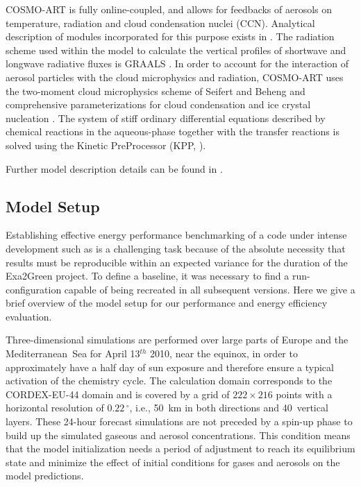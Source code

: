 COSMO-ART  is  fully  online-coupled,  and  allows  for  feedbacks  of
aerosols  on  temperature,  radiation  and cloud  condensation  nuclei
(CCN).   Analytical  description  of  modules  incorporated  for  this
purpose  exists  in  \cite{Vogel-2009, Bangert-2011}.   The  radiation
scheme used  within the  model to calculate  the vertical  profiles of
shortwave and longwave  radiative fluxes is GRAALS \cite{Ritter-1992}.
In order to account for  the interaction of aerosol particles with the
cloud microphysics and radiation,  COSMO-ART uses the two-moment cloud
microphysics  scheme  of Seifert  and  Beheng \cite{Seifert-2006}  and
comprehensive parameterizations for cloud condensation and ice crystal
nucleation  \cite{Bangert-2011, Bangert-2012}.   The  system of  stiff
ordinary differential equations described by chemical reactions in the
aqueous-phase together with the transfer reactions is solved using the
Kinetic PreProcessor (KPP, \cite{Damian-2002}).

Further model description details  can be found in \cite{Bangert-2012,
  Knote-2011, Knote-2013}.

\subsection{Model Setup}
\label{subsec:1.2}

Establishing effective energy performance benchmarking of a code under
intense development such as \cosmoart is a challenging task because of
the  absolute necessity that  results must  be reproducible  within an
expected variance  for the duration of the  Exa2Green pro\-je\-ct.  To
define  a  baseline, it  was  necessary  to  find a  run-configuration
capable of being recreated in all subsequent versions.  Here we give a
brief  overview of  the model  setup  for our  performance and  energy
efficiency evaluation.

Three-dimensional simulations are performed over large parts of Europe
and the Mediterranean~Sea for  April 13$^{th}$ 2010, near the equinox,
in  order  to  approximately have  a  half  day  of sun  exposure  and
therefore  ensure a typical  activation of  the chemistry  cycle.  The
calculation  domain  corresponds to  the  CORDEX-EU-44  domain and  is
covered  by  a  grid  of  $222\times 216$  points  with  a  horizontal
resolution  of $0.22\,^{\circ}$,  i.e., 50~km  in both  directions and
40~vertical  layers.   These  24-hour  forecast  simulations  are  not
preceded  by a spin-up  phase to  build up  the simulated  gaseous and
aerosol   concentrations.   This  condition   means  that   the  model
initialization needs  a period of adjustment to  reach its equilibrium
state  and minimize  the effect  of initial  conditions for  gases and
aerosols on the model predictions.

